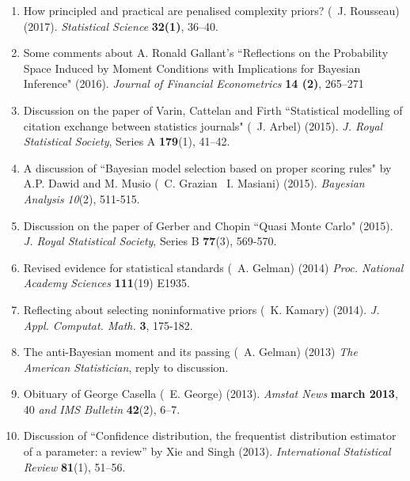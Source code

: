 \begin{enumerate}
\item How principled and practical are penalised complexity priors?
(\avec\ J. Rousseau)  (2017). {\em Statistical Science} {\bf 32(1)}, 36--40.

\item Some comments about A. Ronald Gallant's ``Reflections on the Probability
Space Induced by Moment Conditions with Implications for Bayesian Inference"
(2016). {\em Journal of Financial Econometrics} {\bf 14 (2)}, 265--271

\item Discussion on the paper of Varin, Cattelan and Firth ``Statistical modelling of citation exchange between
statistics journals" (\avec~J. Arbel) (2015). {\em J. Royal Statistical Society}, Series A {\bf 179}(1), 41--42.

\item A discussion of ``Bayesian model selection based on proper scoring
rules" by A.P. Dawid and M. Musio (\avec~C. Grazian \et~I. Masiani) (2015).
{\em Bayesian Analysis} {\em 10}(2), 511-515.

\item Discussion on the paper of Gerber and Chopin ``Quasi Monte Carlo" (2015).
{\em J. Royal Statistical Society}, Series B {\bf 77}(3), 569-570.

\item Revised evidence for statistical standards (\avec~A. Gelman) (2014) {\em Proc. National Academy Sciences} {\bf
111}(19) E1935.
\item Reflecting about selecting noninformative priors (\avec~K. Kamary) (2014). {\em J. Appl. Computat. Math.} {\bf 3},
175-182.


\item The anti-Bayesian moment and its passing (\avec~A. Gelman) (2013)
{\em The American Statistician}, reply to discussion.

\item Obituary of George Casella (\avec~E. George)  
(2013). {\em Amstat News} {\bf march 2013}, 40 {\em and} 
{\em IMS Bulletin} {\bf 42}(2), 6--7.

\item Discussion of ``Confidence distribution, the frequentist distribution estimator of a parameter: a review''
by Xie and Singh (2013). {\em International Statistical Review} {\bf 81}(1), 51--56. 


\end{enumerate}
